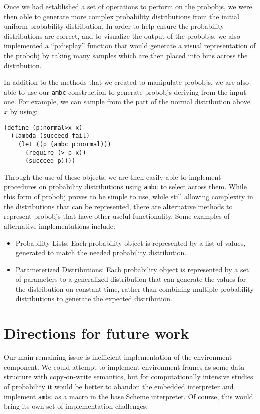 \documentclass{article}
\begin{document}
Once we had established a set of operations to perform on the
{probobj}s, we were then able to generate more complex probability
distributions from the initial uniform probability distribution. In
order to help ensure the probability distributions are correct, and to
visualize the output of the {probobj}s, we also implemented a
``p:display'' function that would generate a visual representation of
the {probobj} by taking many samples which are then placed into bins
across the distribution.

In addition to the methods that we created to manipulate {probobj}s,
we are also able to use our \texttt{ambc} construction to generate
{probobj}s deriving from the input one. For example, we can sample
from the part of the normal distribution above $x$ by using:

\begin{lstlisting}
(define (p:normal>x x)
  (lambda (succeed fail)
    (let ((p (ambc p:normal)))
      (require (> p x))
      (succeed p))))
\end{lstlisting}

Through the use of these objects, we are then easily able to implement
procedures on probability distributions using \texttt{ambc} to select across
them. While this form of {probobj} proves to be simple to use, while still
allowing complexity in the distributions that can be represented, there are
alternative methods to represent {probobj}s that have other useful
functionality. Some examples of alternative implementations include:

\begin{itemize}
  \item Probability Lists: Each probability object is represented by a list of
    values, generated to match the needed probability distribution.
  \item Parameterized Distributions: Each probability object is represented by a
    set of parameters to a generalized distribution that can generate the values
    for the distribution on constant time, rather than combining multiple
    probability distributions to generate the expected distribution.
\end{itemize}

\section{Directions for future work}

Our main remaining issue is inefficient implementation of the
environment component.  We could attempt to implement environment
frames as some data structure with copy-on-write semantics, but for
computationally intensive studies of probability it would be better to
abandon the embedded interpreter and implement \texttt{ambc} as a
macro in the base Scheme interpreter.  Of course, this would bring its
own set of implementation challenges.
\end{document}

